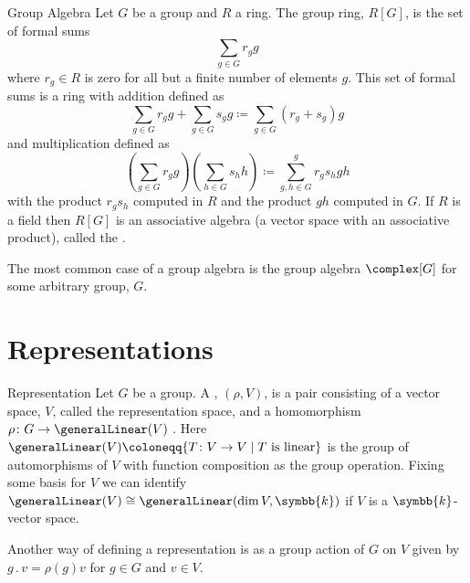 \documentclass[fleqn]{NotesClass}
\renewcommand{\field}{\symbb{k}}
\newcommand{\action}{\mathbin{.}}
\newcommand{\isomorphic}{\cong}
\begin{document}
    \begin{dfn}{Group Algebra}{}
        Let \(G\) be a group and \(R\) a ring.
        The group ring, \(R[G]\), is the set of formal sums
        \begin{equation}
            \sum_{g \in G} r_g g
        \end{equation}
        where \(r_g \in R\) is zero for all but a finite number of elements \(g\).
        This set of formal sums is a ring with addition defined as
        \begin{equation}
            \sum_{g \in G} r_g g + \sum_{g \in G} s_g g \coloneqq \sum_{g\in G}(r_g + s_g) g
        \end{equation}
        and multiplication defined as
        \begin{equation}
            \left( \sum_{g \in G} r_g g \right) \left( \sum_{h \in G} s_h h \right) \coloneqq \sum_{g, h \in G}^{g} r_g s_h gh
        \end{equation}
        with the product \(r_gs_h\) computed in \(R\) and the product \(gh\) computed in \(G\).
        If \(R\) is a field then \(R[G]\) is an associative algebra (a vector space with an associative product), called the  \cite[740]{hassani}.
    \end{dfn}
    
    The most common case of a group algebra is the group algebra \(\complex[G]\) for some arbitrary group, \(G\).
    
    \section{Representations}
    \begin{dfn}{Representation}{}
        Let \(G\) be a group.
        A , \((\rho, V)\), is a pair consisting of a vector space, \(V\), called the representation space, and a homomorphism \(\rho \colon G \to \generalLinear(V)\) \cite[726]{hassani}.
        Here \(\generalLinear(V) \coloneqq \{T \colon V \to V \mid T \text{ is linear}\}\) is the group of automorphisms of \(V\) with function composition as the group operation.
        Fixing some basis for \(V\) we can identify \(\generalLinear(V) \isomorphic \generalLinear(\dim V, \field)\) if \(V\) is a \(\field\)-vector space.
    \end{dfn}
    
    Another way of defining a representation is as a group action of \(G\) on \(V\) given by \(g \action v = \rho(g)v\) for \(g \in G\) and \(v \in V\).
    
\end{document}

